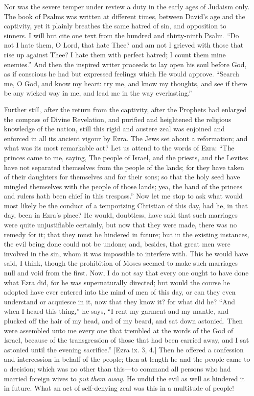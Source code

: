 Nor was the severe temper under review a duty in the early ages of
Judaism only. The book of Psalms was written at different times,
between David's age and the captivity, yet it plainly breathes the
same hatred of sin, and opposition to sinners. I will but cite one
text from the hundred and thirty-ninth Psalm. ``Do not I hate
them, O Lord, that hate Thee? and am not I grieved with those that
rise up against Thee? I hate them with perfect hatred; I count them
mine enemies.'' And then the inspired writer proceeds to lay open
his soul before God, as if conscious he had but expressed feelings
which He would approve. ``Search me, O God, and know my heart: try
me, and know my thoughts, and see if there be any wicked way in me,
and lead me in the way everlasting.''

Further still, after the return from the captivity, after the
Prophets had enlarged the compass of Divine Revelation, and purified
and heightened the religious knowledge of the nation, still this rigid
and austere zeal was enjoined and enforced in all its ancient vigour
by Ezra. The Jews set about a reformation; and what was its most
remarkable act? Let us attend to the words of Ezra: ``The princes
came to me, saying, The people of Israel, and the priests, and the
Levites have not separated themselves from the people of the lands;
for they have taken of their daughters for themselves and for their
sons; so that the holy seed have mingled themselves with the people of
those lands; yea, the hand of the princes and rulers hath been chief
in this trespass.'' Now let me stop to ask what would most likely
be the conduct of a temporizing Christian of this day, had he, in that
day, been in Ezra's place? He would, doubtless, have said that such
marriages were quite unjustifiable certainly, but now that they were
made, there was no remedy for it; that they must be hindered in
future; but in the existing instances, the evil being done could not
be undone; and, besides, that great men were involved in the sin, whom
it was impossible to interfere with. This he would have said, I think,
though the prohibition of Moses seemed to make such marriages null and
void from the first. Now, I do not say that every one ought to have
done what Ezra did, for he was supernaturally directed; but would the
course he adopted have ever entered into the mind of men of this day,
or can they even understand or acquiesce in it, now that they know it?
for what did he? ``And when I heard this thing,'' he says,
``I rent my garment and my mantle, and plucked off the hair of my
head, and of my beard, and sat down astonied. Then were assembled unto
me every one that trembled at the words of the God of Israel, because
of the transgression of those that had been carried away, and I sat
astonied until the evening sacrifice.'' [Ezra ix. 3, 4.] Then he
offered a confession and intercession in behalf of the people; then at
length he and the people came to a decision; which was no other than
this—to command all persons who had married foreign wives to \emph{put
them away}. He undid the evil as well as hindered it in future.
What an act of self-denying zeal was this in a multitude of people!

